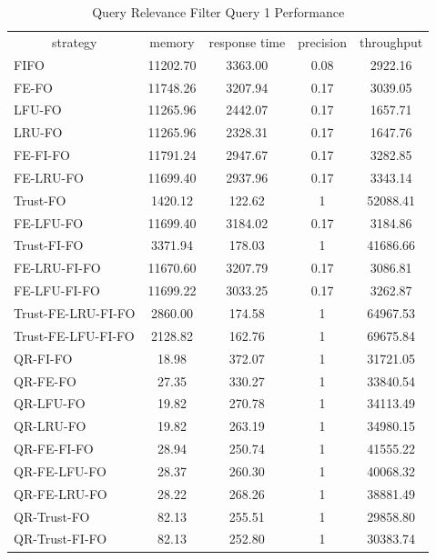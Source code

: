 \begin{table}[!htbp]
	\centering
    \caption{Query Relevance Filter Query 1 Performance}
    \label{tab:6-qrp}
    \begin{tabular}{|l||c|c|c|c|} \hline
         \multicolumn{1}{|c||}{strategy} & memory & response time & precision & throughput \\ \hhline{|=#=|=|=|=|}
FIFO             & 11202.70 & 3363.00 & 0.08 & 2922.16\\ \hline 
FE-FO             & 11748.26 & 3207.94 & 0.17 & 3039.05\\ \hline 
LFU-FO            & 11265.96 & 2442.07 & 0.17 & 1657.71\\ \hline 
LRU-FO            & 11265.96 & 2328.31 & 0.17 & 1647.76\\ \hline 
FE-FI-FO           & 11791.24 & 2947.67 & 0.17 & 3282.85\\ \hline 
FE-LRU-FO          & 11699.40 & 2937.96 & 0.17 & 3343.14\\ \hline 
Trust-FO          & 1420.12 & 122.62 & 1 & 52088.41\\ \hline 
FE-LFU-FO          & 11699.40 & 3184.02 & 0.17 & 3184.86\\ \hline 
Trust-FI-FO        & 3371.94 & 178.03 & 1 & 41686.66\\ \hline 
FE-LRU-FI-FO        & 11670.60 & 3207.79 & 0.17 & 3086.81\\ \hline 
FE-LFU-FI-FO        & 11699.22 & 3033.25 & 0.17 & 3262.87\\ \hline 
Trust-FE-LRU-FI-FO   & 2860.00 & 174.58 & 1 & 64967.53\\ \hline 
Trust-FE-LFU-FI-FO   & 2128.82 & 162.76 & 1 & 69675.84\\ \hhline{|=#=|=|=|=|}
QR-FI-FO           & 18.98 & 372.07 & 1 & 31721.05\\ \hline 
QR-FE-FO           & 27.35 & 330.27 & 1 & 33840.54\\ \hline 
QR-LFU-FO          & 19.82 & 270.78 & 1 & 34113.49\\ \hline 
QR-LRU-FO          & 19.82 & 263.19 & 1 & 34980.15\\ \hline 
QR-FE-FI-FO         & 28.94 & 250.74 & 1 & 41555.22\\ \hline 
QR-FE-LFU-FO        & 28.37 & 260.30 & 1 & 40068.32\\ \hline 
QR-FE-LRU-FO        & 28.22 & 268.26 & 1 & 38881.49\\ \hline 
QR-Trust-FO        & 82.13 & 255.51 & 1 & 29858.80\\ \hline 
QR-Trust-FI-FO      & 82.13 & 252.80 & 1 & 30383.74\\ \hline 

\end{tabular}
\end{table}
